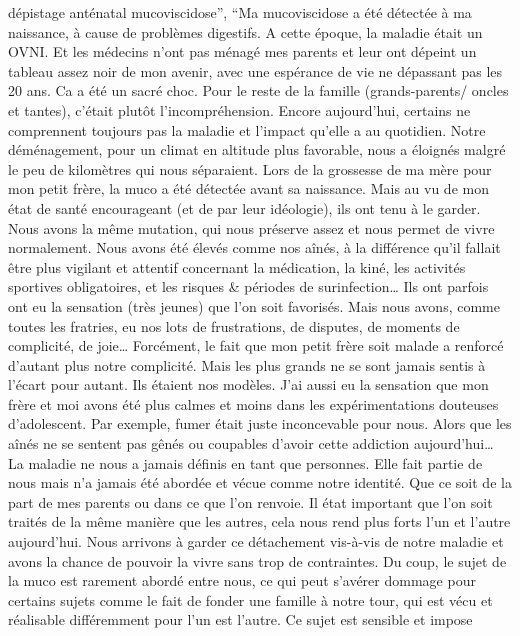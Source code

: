 \documentclass[
  letterpaper,
  DIV=11,
  numbers=noendperiod]{scrartcl}
\begin{document}
\begin{itemize}
  dépistage anténatal mucoviscidose'', ``Ma mucoviscidose a été détectée
  à ma naissance, à cause de problèmes digestifs. A cette époque, la
  maladie était un OVNI. Et les médecins n'ont pas ménagé mes parents et
  leur ont dépeint un tableau assez noir de mon avenir, avec une
  espérance de vie ne dépassant pas les 20 ans. Ca a été un sacré choc.
  Pour le reste de la famille (grands-parents/ oncles et tantes),
  c'était plutôt l'incompréhension. Encore aujourd'hui, certains ne
  comprennent toujours pas la maladie et l'impact qu'elle a au
  quotidien. Notre déménagement, pour un climat en altitude plus
  favorable, nous a éloignés malgré le peu de kilomètres qui nous
  séparaient. Lors de la grossesse de ma mère pour mon petit frère, la
  muco a été détectée avant sa naissance. Mais au vu de mon état de
  santé encourageant (et de par leur idéologie), ils ont tenu à le
  garder. Nous avons la même mutation, qui nous préserve assez et nous
  permet de vivre normalement. Nous avons été élevés comme nos aînés, à
  la différence qu'il fallait être plus vigilant et attentif concernant
  la médication, la kiné, les activités sportives obligatoires, et les
  risques \& périodes de surinfection\ldots{} Ils ont parfois ont eu la
  sensation (très jeunes) que l'on soit favorisés. Mais nous avons,
  comme toutes les fratries, eu nos lots de frustrations, de disputes,
  de moments de complicité, de joie\ldots{} Forcément, le fait que mon
  petit frère soit malade a renforcé d'autant plus notre complicité.
  Mais les plus grands ne se sont jamais sentis à l'écart pour autant.
  Ils étaient nos modèles. J'ai aussi eu la sensation que mon frère et
  moi avons été plus calmes et moins dans les expérimentations douteuses
  d'adolescent. Par exemple, fumer était juste inconcevable pour nous.
  Alors que les aînés ne se sentent pas gênés ou coupables d'avoir cette
  addiction aujourd'hui\ldots{} La maladie ne nous a jamais définis en
  tant que personnes. Elle fait partie de nous mais n'a jamais été
  abordée et vécue comme notre identité. Que ce soit de la part de mes
  parents ou dans ce que l'on renvoie. Il état important que l'on soit
  traités de la même manière que les autres, cela nous rend plus forts
  l'un et l'autre aujourd'hui. Nous arrivons à garder ce détachement
  vis-à-vis de notre maladie et avons la chance de pouvoir la vivre sans
  trop de contraintes. Du coup, le sujet de la muco est rarement abordé
  entre nous, ce qui peut s'avérer dommage pour certains sujets comme le
  fait de fonder une famille à notre tour, qui est vécu et réalisable
  différemment pour l'un est l'autre. Ce sujet est sensible et impose

\end{itemize}
\end{document}
